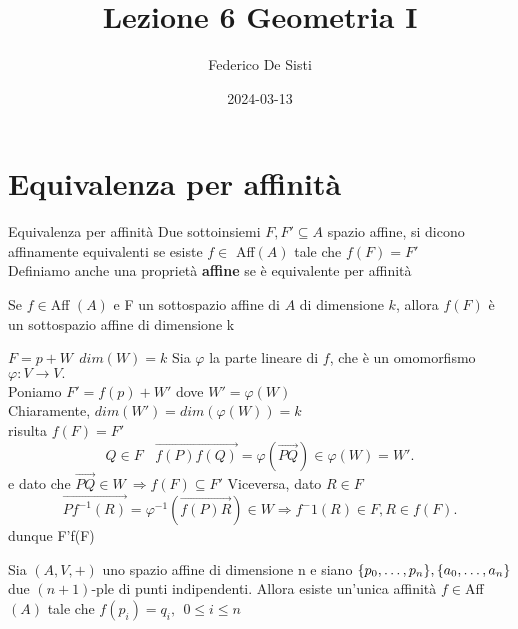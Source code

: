 \documentclass[12px]{article}
\title{Lezione 6 Geometria I}
\date{2024-03-13}
\author{Federico De Sisti}
\begin{document}
	\maketitle
	\newpage
	\section{Equivalenza per affinità}
	\begin{defi}{Equivalenza per affinità}{}
		Due sottoinsiemi $F, F'\subseteq A$ spazio affine, si dicono affinamente equivalenti se esiste $f\in$ Aff$(A)$ tale che $f(F) = F'$\\
		Definiamo anche una proprietà \textbf{affine} se è equivalente per affinità
	\end{defi}
	\begin{prop}{}{}
		Se $f\in$Aff $(A)$ e F un sottospazio affine di $A$ di dimensione $k$, allora $f(F)$ è un sottospazio affine di dimensione k
	\end{prop}
	\begin{dimo} 
		$F = p + W \ \ dim(W) = k$ Sia $\varphi$ la parte lineare di $f$, che è un omomorfismo $\varphi:V \rightarrow V.$\\
		Poniamo $F' = f(p) + W'$ dove $W' = \varphi(W)$\\
		Chiaramente, $dim(W') = dim(\varphi(W)) = k$ \\
		risulta $f(F) = F'$\\ \[
		Q\in F \ \ \ \ \overrightarrow{f(P)f(Q)} = \varphi(\overrightarrow{PQ})\in \varphi(W) = W'
		.\] 
		e dato che $ \overrightarrow{PQ}\in W \ \Rightarrow f(F)\subseteq F'$
		Viceversa, dato $R\in F$ 
		\[
			\overrightarrow{Pf^{-1}(R)} = \varphi^{-1}(\overrightarrow{f(P)R})\in W \Rightarrow  f^-1(R) \in F, R\in f(F)
		.\] 
		dunque F'\subseteq f(F)
	\end{dimo}
	\begin{teo}
		Sia $(A, V, +)$ uno spazio affine di dimensione n e siano $\{p_0,\ldots,p_n\}, \\ \{a_0,\ldots,a_n\}$ due $(n+1)$-ple di punti indipendenti. Allora esiste un'unica affinità $f\in$Aff$(A)$ tale che $f(p_i) = q_i, \ \ 0\leq i\leq n$
	\end{teo}
\end{document}
